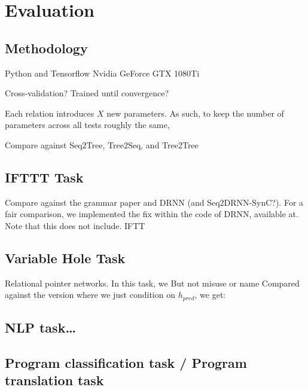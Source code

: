 \section{Evaluation}\label{sec:evaluation}

\subsection{Methodology}

Python and Tensorflow Nvidia GeForce GTX 1080Ti

Cross-validation? Trained until convergence?

Each relation introduces $X$ new parameters. As such,
to keep the number of parameters across all tests roughly the same, 


Compare against Seq2Tree, Tree2Seq, and Tree2Tree

\subsection{IFTTT Task}
Compare against the grammar paper and DRNN (and Seq2DRNN-SynC?).
For a fair comparison, we implemented the fix within the code of DRNN, available 
at. Note that this does not include.  IFTT

\subsection{Variable Hole Task}

Relational pointer networks. In this task, we But not misuse or name
Compared against the version where we just condition on $h_{pred}$, we get:

\subsection{NLP task\ldots}

\subsection{Program classification task / Program translation task}
